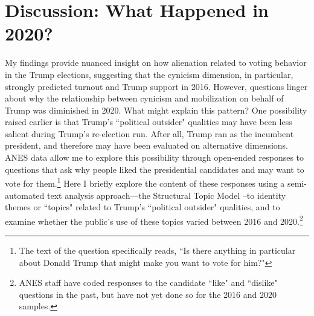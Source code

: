 \documentclass[12pt]{article}
\begin{document}
\section*{Discussion: What Happened in 2020?}\label{sec:discussion}
My findings provide nuanced insight on how alienation related to voting behavior in the Trump elections, suggesting that the cynicism dimension, in particular, strongly predicted turnout and Trump support in 2016. However, questions linger about why the relationship between cynicism and mobilization on behalf of Trump was diminished in 2020. What might explain this pattern? One possibility raised earlier is that Trump's ``political outsider" qualities may have been less salient during Trump's re-election run. After all, Trump ran as the incumbent president, and therefore may have been evaluated on alternative dimensions. ANES data allow me to explore this possibility through open-ended responses to questions that ask why people liked the presidential candidates and may want to vote for them.\footnote{The text of the question specifically reads, ``Is there anything in particular about Donald Trump that might make you want to vote for him?"} Here I briefly explore the content of these responses using a semi-automated text analysis approach---the Structural Topic Model \parencite{roberts2014stm}--to identity themes or ``topics" related to Trump's ``political outsider" qualities, and to examine whether the public's use of these topics varied between 2016 and 2020.\footnote{ANES staff have coded responses to the candidate ``like" and ``dislike" questions in the past, but have not yet done so for the 2016 and 2020 samples.}
\end{document}
